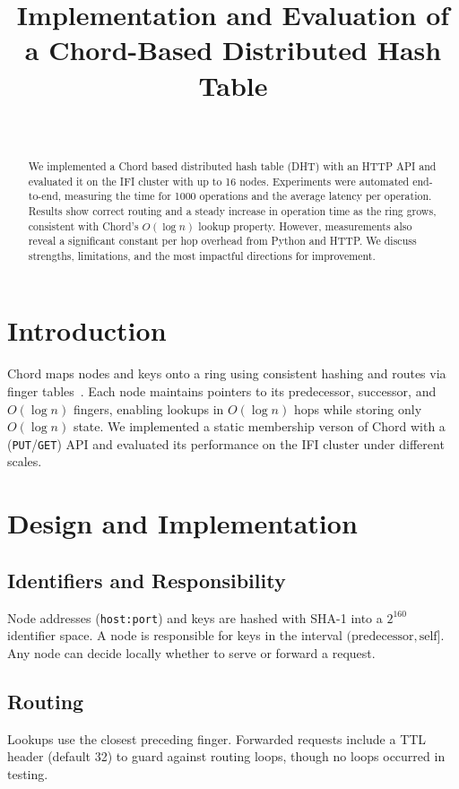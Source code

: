 \documentclass[conference]{IEEEtran}
\title{Implementation and Evaluation of a Chord-Based Distributed Hash Table}
\author{
  \IEEEauthorblockN{Carlo Alberto Cacopardo}
  \IEEEauthorblockA{UiT The Arctic University of Norway} \\
  \IEEEauthorblockN{Ruben Sebastian Rogne}
  \IEEEauthorblockA{UiT The Arctic University of Norway}
}
\begin{document}
\maketitle

\begin{abstract}
We implemented a Chord based distributed hash table (DHT) with an HTTP API and evaluated it on the IFI cluster with up to 16 nodes. Experiments were automated end-to-end, measuring the time for 1000 operations and the average latency per operation. Results show correct routing and a steady increase in operation time as the ring grows, consistent with Chord’s $O(\log n)$ lookup property. However, measurements also reveal a significant constant per hop overhead from Python and HTTP. We discuss strengths, limitations, and the most impactful directions for improvement.
\end{abstract}

\section{Introduction}
Chord maps nodes and keys onto a ring using consistent hashing and routes via finger tables~\cite{stoica2003chord}. Each node maintains pointers to its predecessor, successor, and $O(\log n)$ fingers, enabling lookups in $O(\log n)$ hops while storing only $O(\log n)$ state.  
We implemented a static membership verson of Chord with a (\texttt{PUT}/\texttt{GET}) API and evaluated its performance on the IFI cluster under different scales.

\section{Design and Implementation}
\subsection{Identifiers and Responsibility}
Node addresses (\texttt{host:port}) and keys are hashed with SHA-1 into a $2^{160}$ identifier space. A node is responsible for keys in the interval $(\text{predecessor}, \text{self}]$. Any node can decide locally whether to serve or forward a request.

\subsection{Routing}
Lookups use the closest preceding finger. Forwarded requests include a TTL header (default 32) to guard against routing loops, though no loops occurred in testing.
\end{document}
